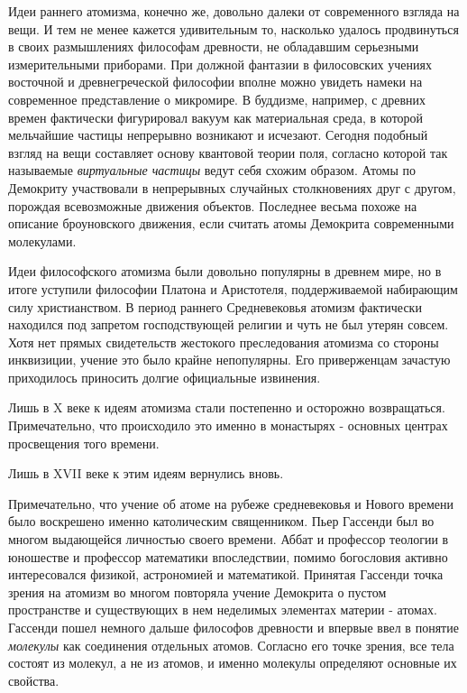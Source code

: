 Идеи раннего атомизма, конечно же, довольно далеки от современного взгляда на вещи.
И тем не менее кажется удивительным то, насколько удалось продвинуться в своих размышлениях философам древности, не обладавшим серьезными измерительными приборами.
При должной фантазии в филосовских учениях восточной и древнегреческой философии вполне можно увидеть намеки на современное представление о микромире.
В буддизме, например, с древних времен фактически фигурировал вакуум как материальная среда, в которой мельчайшие частицы непрерывно возникают и исчезают. 
Сегодня подобный взгляд на вещи составляет основу квантовой теории поля, согласно которой так называемые \textit{виртуальные частицы} ведут себя схожим образом. 
Атомы по Демокриту участвовали в непрерывных случайных столкновениях друг с другом, порождая всевозможные движения объектов. 
Последнее весьма похоже на описание броуновского движения, если считать атомы Демокрита современными молекулами.

Идеи философского атомизма были довольно популярны в древнем мире, но в итоге уступили философии Платона и Аристотеля, поддерживаемой набирающим силу христианством.
В период раннего Средневековья атомизм фактически находился под запретом господствующей религии и чуть не был утерян совсем.
Хотя нет прямых свидетельств жестокого преследования атомизма со стороны инквизиции, учение это было крайне непопулярны.
Его приверженцам зачастую приходилось приносить долгие официальные извинения. 

Лишь в X веке к идеям атомизма стали постепенно и осторожно возвращаться.
Примечательно, что происходило это именно в монастырях - основных центрах просвещения того времени.





Лишь в XVII веке к этим идеям вернулись вновь.

Примечательно, что учение об атоме на рубеже средневековья и Нового времени было воскрешено именно католическим священником. 
Пьер Гассенди был во многом выдающейся личностью своего времени. 
Аббат и профессор теологии в юношестве и профессор математики впоследствии, помимо богословия активно интересовался физикой, астрономией и математикой. 
Принятая Гассенди точка зрения на атомизм во многом повторяла учение Демокрита о пустом пространстве и существующих в нем неделимых элементах материи - атомах. 
Гассенди пошел немного дальше философов древности и впервые ввел в понятие \textit{молекулы} как соединения отдельных атомов. 
Согласно его точке зрения, все тела состоят из молекул, а не из атомов, и именно молекулы определяют основные их свойства. 

